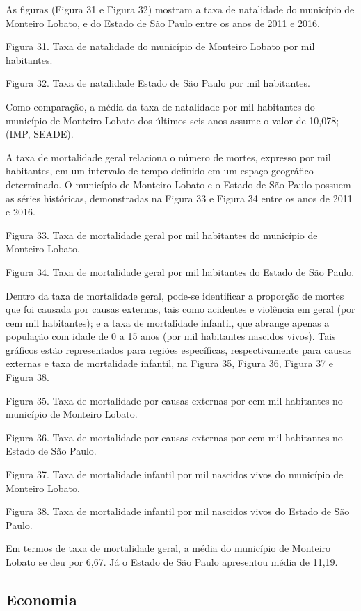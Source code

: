 As figuras (Figura 31 e Figura 32) mostram a taxa de natalidade do município de Monteiro Lobato, e do Estado de São Paulo entre os anos de 2011 e 2016.
 
Figura 31. Taxa de natalidade do município de Monteiro Lobato por mil habitantes.

Figura 32. Taxa de natalidade Estado de São Paulo por mil habitantes.

Como comparação, a média da taxa de natalidade por mil habitantes do município de Monteiro Lobato dos últimos seis anos assume o valor de 10,078; (IMP, SEADE).

A taxa de mortalidade geral relaciona o número de mortes, expresso por mil habitantes, em um intervalo de tempo definido em um espaço geográfico determinado. O município de Monteiro Lobato e o Estado de São Paulo possuem as séries históricas, demonstradas na Figura 33 e Figura 34 entre os anos de 2011 e 2016.

Figura 33. Taxa de mortalidade geral por mil habitantes do município de Monteiro Lobato.

Figura 34. Taxa de mortalidade geral por mil habitantes do Estado de São Paulo.

Dentro da taxa de mortalidade geral, pode-se identificar a proporção de mortes que foi causada por causas externas, tais como acidentes e violência em geral (por cem mil habitantes); e a taxa de mortalidade infantil, que abrange apenas a população com idade de 0 a 15 anos (por mil habitantes nascidos vivos). Tais gráficos estão representados para regiões específicas, respectivamente para causas externas e taxa de mortalidade infantil, na Figura 35,  Figura 36, Figura 37 e Figura 38.

Figura 35. Taxa de mortalidade por causas externas por cem mil habitantes no município de Monteiro Lobato.

Figura 36. Taxa de mortalidade por causas externas por cem mil habitantes no Estado de São Paulo.
 
Figura 37. Taxa de mortalidade infantil por mil nascidos vivos do município de Monteiro Lobato.

Figura 38. Taxa de mortalidade infantil por mil nascidos vivos do Estado de São Paulo.

Em termos de taxa de mortalidade geral, a média do município de Monteiro Lobato se deu por 6,67. Já o Estado de São Paulo apresentou média de 11,19.

\subsection{Economia}

